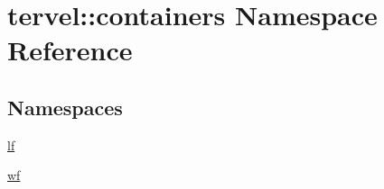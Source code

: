 \hypertarget{namespacetervel_1_1containers}{}\section{tervel\+:\+:containers Namespace Reference}
\label{namespacetervel_1_1containers}
\subsection*{Namespaces}
\begin{DoxyCompactItemize}
\item 
 \hyperlink{namespacetervel_1_1containers_1_1lf}{lf}
\item 
 \hyperlink{namespacetervel_1_1containers_1_1wf}{wf}
\end{DoxyCompactItemize}
